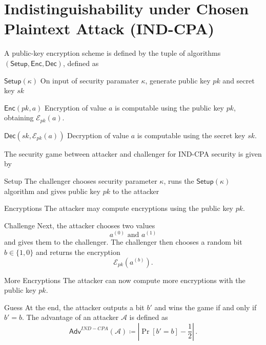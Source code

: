 \documentclass[10pt,letterpaper,oneside,twocolumn,journal]{IEEEtran}
\theoremstyle{definition}
\theoremstyle{definition}
\theoremstyle{remark}
\begin{document}
\section{Indistinguishability under Chosen Plaintext Attack (IND-CPA)} \label{app:ind_cpa}
A public-key encryption scheme is defined by the tuple of algorithms $(\mathsf{Setup}, \mathsf{Enc}, \mathsf{Dec})$, defined as
\begin{LaTeXdescription}
    \item[$\mathsf{Setup}(\kappa)$] On input of security paramater $\kappa$, generate public key $pk$ and secret key $sk$
    \item[$\mathsf{Enc}(pk, a)$] Encryption of value $a$ is computable using the public key $pk$, obtaining $\mathcal{E}_{pk}(a)$.
    \item[$\mathsf{Dec}(sk, \mathcal{E}_{pk}(a))$] Decryption of value $a$ is computable using the secret key $sk$.
\end{LaTeXdescription}

The security game between attacker and challenger for IND-CPA security is given by
\begin{LaTeXdescription}
    \item[Setup] The challenger chooses security parameter $\kappa$, runs the $\mathsf{Setup}(\kappa)$ algorithm and gives public key $pk$ to the attacker
    \item[Encryptions] The attacker may compute encryptions using the public key $pk$.
    \item[Challenge] Next, the attacker chooses two values
    \begin{equation*}
        a^{(0)} \text{ and } a^{(1)}
    \end{equation*}
    and gives them to the challenger. The challenger then chooses a random bit $b \in \{1,0\}$ and returns the encryption
    \begin{equation*}
        \mathcal{E}_{pk}(a^{(b)}).
    \end{equation*}
    \item[More Encryptions] The attacker can now compute more encryptions with the public key $pk$.
    \item[Guess] At the end, the attacker outputs a bit $b'$ and wins the game if and only if $b' = b$. The advantage of an attacker $\mathcal{A}$ is defined as
    \begin{equation*}
        \mathsf{Adv}^{IND-CPA}(\mathcal{A}) \coloneqq \left\lvert \Pr [b'=b] - \frac{1}{2}\right\rvert\,.
    \end{equation*} 
\end{LaTeXdescription}
\end{document}
